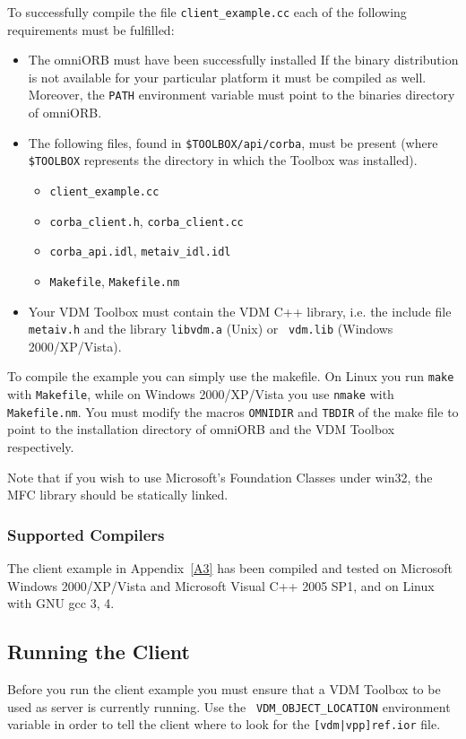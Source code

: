 \documentclass[\pformat,12pt]{article}
\begin{document}
To successfully compile the file {\tt client\_example.cc} each of the
following requirements must be fulfilled: 

\begin{itemize}
\item The omniORB must have been successfully installed
  If the binary 
  distribution is not available for your particular platform it must
  be compiled as well. Moreover, the {\tt PATH} environment variable
  must point to the binaries directory of omniORB.

\item 
The following files, found in \texttt{\$TOOLBOX/api/corba},
must be present (where \texttt{\$TOOLBOX} represents the directory in
which the Toolbox was installed).
\begin{itemize}
\item {\tt client\_example.cc}
\item {\tt corba\_client.h}, {\tt corba\_client.cc}
\item {\tt corba\_api.idl}, {\tt metaiv\_idl.idl}
\item {\tt Makefile}, {\tt Makefile.nm}
\end{itemize}

\item
Your VDM Toolbox must contain the VDM C++ library, i.e. the include
file {\tt metaiv.h} and the library {\tt libvdm.a} (Unix) or {\tt
vdm.lib} (Windows 2000/XP/Vista). 
\end{itemize}

To compile the example you can simply use the makefile. On Linux 
you run {\tt make} with {\tt Makefile},
while on Windows 2000/XP/Vista you use {\tt nmake} with {\tt Makefile.nm}. You
must modify the macros {\tt OMNIDIR} and {\tt TBDIR} of the make file
to point to the installation directory of omniORB and the VDM Toolbox
respectively. 

Note that if you wish to use Microsoft's Foundation Classes under
win32, the MFC library should be statically linked.

\subsubsection{Supported Compilers}

The client example in Appendix~\ref{A3} has been compiled and tested
on Microsoft Windows 2000/XP/Vista and Microsoft Visual C++ 2005 SP1, 
and on Linux with GNU gcc 3, 4.

\subsection{Running the Client}
Before you run the client example you must ensure that a VDM Toolbox
to be used as server is currently running. Use the {\tt
  VDM\_OBJECT\_LOCATION} environment variable in order to tell the
client where to look for the {\tt [vdm|vpp]ref.ior} file.
\end{document}
